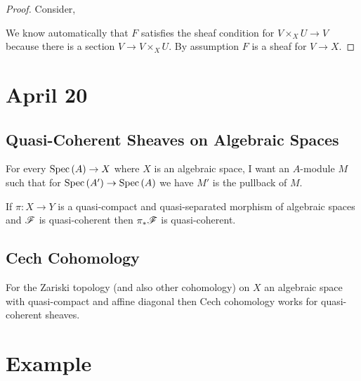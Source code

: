 \documentclass[12pt]{article}
\begin{document}
\begin{proof}
Consider,
\begin{center}
\end{center}
We know automatically that $F$ satisfies the sheaf condition for $V \times_X U \to V$ because there is a section $V \to V \times_X U$. By assumption $F$ is a sheaf for $V \to X$. 
\end{proof}

\section{April 20}

\subsection{Quasi-Coherent Sheaves on Algebraic Spaces}

For every $\mathrm{Spec}\left( A \right) \to X$ where $X$ is an algebraic space, I want an $A$-module $M$ such that for $\mathrm{Spec}\left( A' \right) \to \mathrm{Spec}\left( A \right)$ we have $M'$ is the pullback of $M$. 

\begin{prop}
If $\pi : X \to Y$ is a quasi-compact and quasi-separated morphism of algebraic spaces and $\mathscr{F}$ is quasi-coherent then $\pi_* \mathscr{F}$ is quasi-coherent.
\end{prop}

\subsection{Cech Cohomology}

For the Zariski topology (and also other cohomology) on $X$ an algebraic space with quasi-compact and affine diagonal then Cech cohomology works for quasi-coherent sheaves.

\section{Example}
\end{document}
